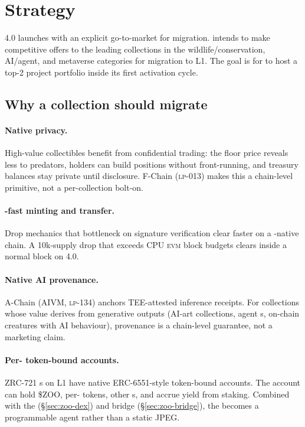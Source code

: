 \section{\NFT{} Strategy}
\label{sec:nft-strategy}

\Zoo{} 4.0 launches with an explicit go-to-market for \NFT{} migration.
\Zoo{} intends to make competitive offers to the leading \NFT{}
collections in the wildlife/conservation, AI/agent, and metaverse
categories for migration to \Zoo{} L1. The goal is for \Zoo{} to host a
top-2 \NFT{} project portfolio inside its first activation cycle.

\subsection{Why a collection should migrate}

\paragraph{Native \FHE{} privacy.}
High-value collectibles benefit from confidential trading: the floor
price reveals less to predators, holders can build positions without
front-running, and treasury balances stay private until disclosure.
F-Chain (\textsc{lp-013}) makes this a chain-level primitive, not a
per-collection bolt-on.

\paragraph{\GPU{}-fast minting and transfer.}
Drop mechanics that bottleneck on signature verification clear faster
on a \GPU{}-native chain. A 10k-supply drop that exceeds CPU \textsc{evm}
block budgets clears inside a normal block on \Zoo{} 4.0.

\paragraph{Native AI provenance.}
A-Chain (AIVM, \textsc{lp-134}) anchors TEE-attested inference
receipts. For collections whose value derives from generative outputs
(AI-art collections, agent \NFT{}s, on-chain creatures with AI
behaviour), provenance is a chain-level guarantee, not a marketing
claim.

\paragraph{Per-\NFT{} token-bound accounts.}
ZRC-721 \NFT{}s on \Zoo{} L1 have native ERC-6551-style token-bound
accounts. The account can hold \$ZOO, per-\LLM{} tokens, other
\NFT{}s, and accrue yield from staking. Combined with the \Zoo{} \DEX{}
(\S\ref{sec:zoo-dex}) and bridge (\S\ref{sec:zoo-bridge}), the \NFT{}
becomes a programmable agent rather than a static JPEG.


